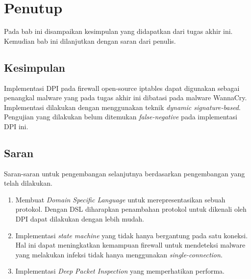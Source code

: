 \chapter{Penutup}

Pada bab ini disampaikan kesimpulan yang didapatkan dari tugas akhir ini. Kemudian bab ini dilanjutkan dengan saran dari penulis.

\section{Kesimpulan}

Implementasi DPI pada firewall open-source iptables dapat digunakan sebagai penangkal malware yang pada tugas akhir ini dibatasi pada malware WannaCry. Implementasi dilakukan dengan menggunakan teknik \textit{dynamic signature-based}. Pengujian yang dilakukan belum ditemukan \textit{false-negative} pada implementasi DPI ini.

\section{Saran}

Saran-saran untuk pengembangan selanjutnya berdasarkan pengembangan yang telah dilakukan.
\begin{enumerate}
	\item Membuat \textit{Domain Specific Language} untuk merepresentasikan sebuah protokol. Dengan DSL diharapkan penambahan protokol untuk dikenali oleh DPI dapat dilakukan dengan lebih mudah.
	\item Implementasi \textit{state machine} yang tidak hanya bergantung pada satu koneksi. Hal ini dapat meningkatkan kemampuan firewall untuk mendeteksi malware yang melakukan infeksi tidak hanya menggunakan \textit{single-connection}.
	\item Implementasi \textit{Deep Packet Inspection} yang memperhatikan performa.
\end{enumerate}